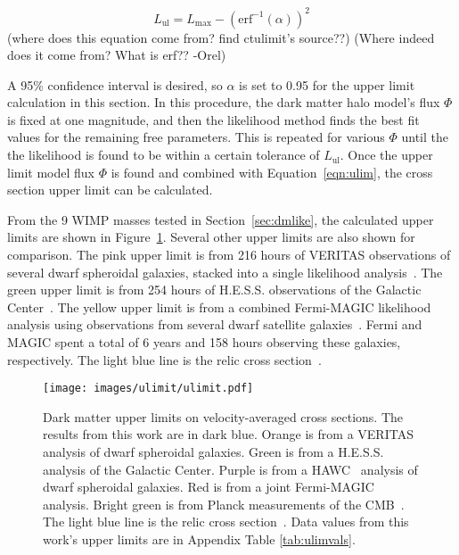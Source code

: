   \begin{equation}\label{eqn:ulim_deltaL}
    L_{\textrm{ul}} = L_{\textrm{max}} - \left ( \textrm{erf}^{-1} \left ( \alpha \right ) \right )^2
  \end{equation}
  {\color{red}(where does this equation come from? find ctulimit's source??)}
  {\color{red}(Where indeed does it come from? What is erf?? -Orel)}

  A 95\% confidence interval is desired, so $\alpha$ is set to 0.95 for the upper limit calculation in this section.
  In this procedure, the dark matter halo model's flux $\Phi$ is fixed at one magnitude, and then the likelihood method finds the best fit values for the remaining free parameters.
  This is repeated for various $\Phi$ until the the likelihood is found to be within a certain tolerance of $L_{\textrm{ul}}$.
  Once the upper limit model flux $\Phi$ is found and combined with Equation~\ref{eqn:ulim}, the cross section upper limit can be calculated.

  From the 9 WIMP masses tested in Section~\ref{sec:dmlike}, the calculated upper limits are shown in Figure~\ref{fig:ulim}.
  Several other upper limits are also shown for comparison.
  The pink upper limit is from 216 hours of VERITAS observations of several dwarf spheroidal galaxies, stacked into a single likelihood analysis~\cite{verdsphul}.
  The green upper limit is from 254 hours of H.E.S.S. observations of the Galactic Center~\cite{hessgcul}.
  The yellow upper limit is from a combined Fermi-MAGIC likelihood analysis using observations from several dwarf satellite galaxies~\cite{fermagicul}.
  Fermi and MAGIC spent a total of 6 years and 158 hours observing these galaxies, respectively.
  The light blue line is the relic cross section~\cite{updatedWIMPRelicCrossSection}.
  
  \begin{figure}[ht]
    \centering
    \texttt{[image: images/ulimit/ulimit.pdf]}
    \caption[Dark Matter Upper Limit Plot]{
      Dark matter upper limits on velocity-averaged cross sections.
      The results from this work are in dark blue.
      Orange is from a VERITAS~\cite{veritas_dm_limit} analysis of dwarf spheroidal galaxies.
      Green is from a H.E.S.S.~\cite{hess_dm_limit} analysis of the Galactic Center.
      Purple is from a HAWC~\cite{hawc_dm_limit} analysis of dwarf spheroidal galaxies.
      Red is from a joint Fermi-MAGIC~\cite{fermagicul} analysis.
      Bright green is from Planck measurements of the CMB~\cite{planck_dm_limit}.
      The light blue line is the relic cross section~\cite{updatedWIMPRelicCrossSection}.
      Data values from this work's upper limits are in Appendix Table \ref{tab:ulimvals}.
    }
    \label{fig:ulim}
  \end{figure}
  
